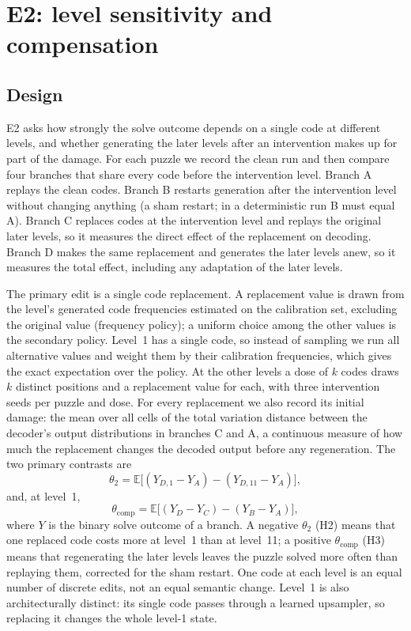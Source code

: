 \section{E2: level sensitivity and compensation}
\label{sec:e2}

\subsection{Design}
\label{sec:e2-design}

E2 asks how strongly the solve outcome depends on a single code at different levels, and whether generating the later levels after an intervention makes up for part of the damage. For each puzzle we record the clean run and then compare four branches that share every code before the intervention level. Branch A replays the clean codes. Branch B restarts generation after the intervention level without changing anything (a sham restart; in a deterministic run B must equal A). Branch C replaces codes at the intervention level and replays the original later levels, so it measures the direct effect of the replacement on decoding. Branch D makes the same replacement and generates the later levels anew, so it measures the total effect, including any adaptation of the later levels.

The primary edit is a single code replacement. A replacement value is drawn from the level's generated code frequencies estimated on the calibration set, excluding the original value (frequency policy); a uniform choice among the other values is the secondary policy. Level~1 has a single code, so instead of sampling we run all alternative values and weight them by their calibration frequencies, which gives the exact expectation over the policy. At the other levels a dose of $k$ codes draws $k$ distinct positions and a replacement value for each, with three intervention seeds per puzzle and dose. For every replacement we also record its initial damage: the mean over all cells of the total variation distance between the decoder's output distributions in branches C and A, a continuous measure of how much the replacement changes the decoded output before any regeneration. The two primary contrasts are
\[
\theta_2 = \mathbb{E}\bigl[(Y_{D,1}-Y_A)-(Y_{D,11}-Y_A)\bigr],
\]
and, at level~1,
\[
\theta_{\mathrm{comp}} = \mathbb{E}\bigl[(Y_D-Y_C)-(Y_B-Y_A)\bigr],
\]
where $Y$ is the binary solve outcome of a branch. A negative $\theta_2$ (H2) means that one replaced code costs more at level~1 than at level~11; a positive $\theta_{\mathrm{comp}}$ (H3) means that regenerating the later levels leaves the puzzle solved more often than replaying them, corrected for the sham restart. One code at each level is an equal number of discrete edits, not an equal semantic change. Level~1 is also architecturally distinct: its single code passes through a learned upsampler, so replacing it changes the whole level-1 state.

